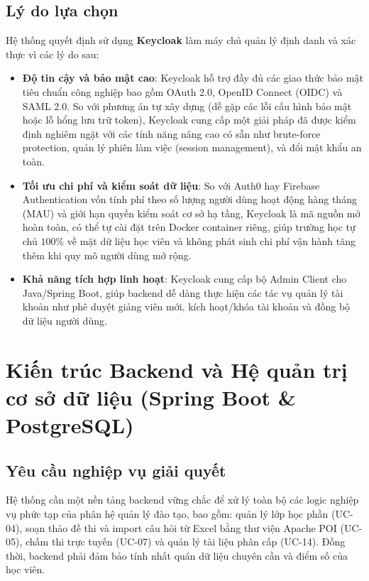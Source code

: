 \documentclass[../DoAn.tex]{subfiles}
\begin{document}
\subsection{Lý do lựa chọn}
Hệ thống quyết định sử dụng \textbf{Keycloak} \cite{keycloak2026} làm máy chủ quản lý định danh và xác thực vì các lý do sau:
\begin{itemize}
    \item \textbf{Độ tin cậy và bảo mật cao}: Keycloak hỗ trợ đầy đủ các giao thức bảo mật tiêu chuẩn công nghiệp bao gồm OAuth 2.0, OpenID Connect (OIDC) và SAML 2.0. So với phương án tự xây dựng (dễ gặp các lỗi cấu hình bảo mật hoặc lỗ hổng lưu trữ token), Keycloak cung cấp một giải pháp đã được kiểm định nghiêm ngặt với các tính năng nâng cao có sẵn như brute-force protection, quản lý phiên làm việc (session management), và đổi mật khẩu an toàn.
    \item \textbf{Tối ưu chi phí và kiểm soát dữ liệu}: So với Auth0 hay Firebase Authentication vốn tính phí theo số lượng người dùng hoạt động hàng tháng (MAU) và giới hạn quyền kiểm soát cơ sở hạ tầng, Keycloak là mã nguồn mở hoàn toàn, có thể tự cài đặt trên Docker container riêng, giúp trường học tự chủ $100\%$ về mặt dữ liệu học viên và không phát sinh chi phí vận hành tăng thêm khi quy mô người dùng mở rộng.
    \item \textbf{Khả năng tích hợp linh hoạt}: Keycloak cung cấp bộ Admin Client cho Java/Spring Boot, giúp backend dễ dàng thực hiện các tác vụ quản lý tài khoản như phê duyệt giảng viên mới, kích hoạt/khóa tài khoản và đồng bộ dữ liệu người dùng.
\end{itemize}

\section{Kiến trúc Backend và Hệ quản trị cơ sở dữ liệu (Spring Boot \& PostgreSQL)}
\label{section:3.2}

\subsection{Yêu cầu nghiệp vụ giải quyết}
Hệ thống cần một nền tảng backend vững chắc để xử lý toàn bộ các logic nghiệp vụ phức tạp của phân hệ quản lý đào tạo, bao gồm: quản lý lớp học phần (UC-04), soạn thảo đề thi và import câu hỏi từ Excel bằng thư viện Apache POI (UC-05), chấm thi trực tuyến (UC-07) và quản lý tài liệu phân cấp (UC-14). Đồng thời, backend phải đảm bảo tính nhất quán dữ liệu chuyên cần và điểm số của học viên.
\end{document}
